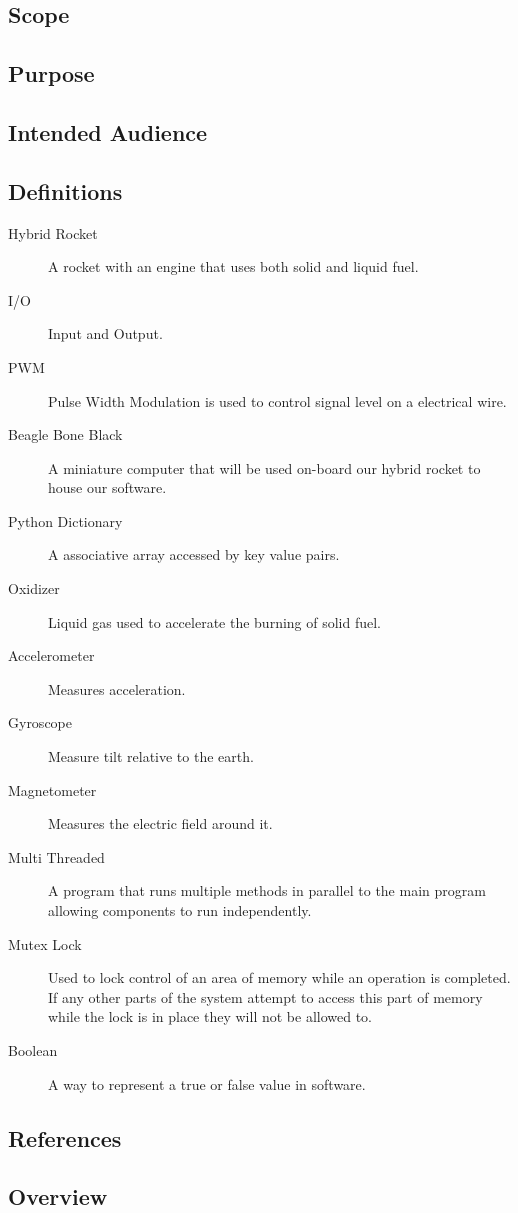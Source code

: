 \documentclass[10pt,draftclsnofoot,onecolumn,compsoc]{IEEEtran}
\begin{document}
\subsection{Scope}
\subsection{Purpose}
\subsection{Intended Audience}
\subsection{Definitions}
\begin{description}
	\item[Hybrid Rocket] A rocket with an engine that uses both solid and liquid fuel.
	\item[I/O] Input and Output.
	\item[PWM] Pulse Width Modulation is used to control signal level on a electrical wire.
	\item[Beagle Bone Black] A miniature computer that will be used on-board our hybrid rocket to house our software.
	\item[Python Dictionary] A associative array accessed by key value pairs.
	\item[Oxidizer] Liquid gas used to accelerate the burning of solid fuel.
	\item[Accelerometer] Measures acceleration.
	\item[Gyroscope] Measure tilt relative to the earth.
	\item[Magnetometer] Measures the electric field around it.
	\item[Multi Threaded] A program that runs multiple methods in parallel to the main program allowing components to run independently.
	\item[Mutex Lock] Used to lock control of an area of memory while an operation is completed. If any other parts of the system attempt to access this part of memory while the lock is in place they will not be allowed to.
	\item[Boolean] A way to represent a true or false value in software.
\end{description}
\subsection{References}
\subsection{Overview}
\end{document}
